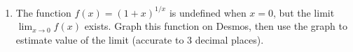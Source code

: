 \documentclass[11pt]{article}
\newcommand{\ds}{\displaystyle}
\begin{document}
\begin{enumerate}
\begin{multicols}{3}
\begin{enumerate}
\item $\ds \lim_{x \rightarrow -2^-} f(x)$
\item $\ds \lim_{x \rightarrow -2^+} f(x)$
\item $\ds \lim_{x \rightarrow -2} f(x)$
\end{enumerate}
\end{multicols}
\vfill

\begin{multicols}{3}
\begin{enumerate}
\setcounter{enumii}{3}
\item $\ds \lim_{x \rightarrow 2^-} f(x)$
\item $\ds \lim_{x \rightarrow 2^+} f(x)$
\item $\ds \lim_{x \rightarrow 2} f(x)$
\end{enumerate}
\end{multicols}
\vfill

\item The function $f(x) = (1+x)^{1/x}$ is undefined when $x=0$, but the limit $\lim_{x \rightarrow 0} f(x)$ exists.  Graph this function on Desmos, then use the graph to estimate value of the limit (accurate to 3 decimal places).
\vfill
\setcounter{enumCount}{\theenumi}
\end{enumerate}
\end{document}
